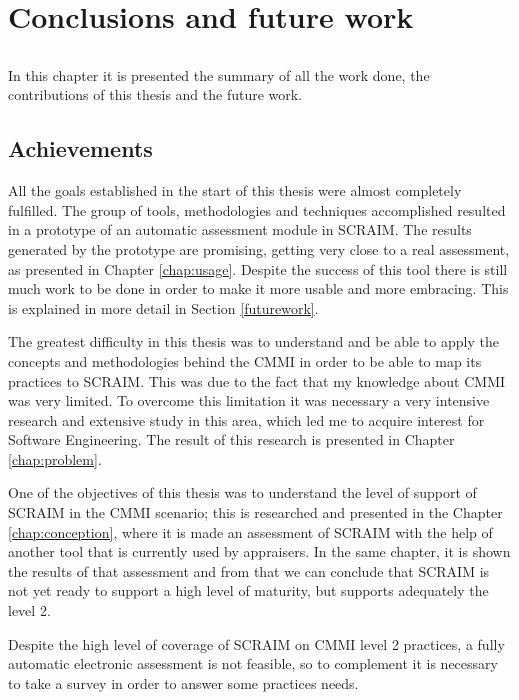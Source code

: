 \chapter{Conclusions and future work} \label{chap:conclusion}

\section*{}
In this chapter it is presented the summary of all the work done, the contributions of this thesis  and the future work.

\section{Achievements}

All the goals established in the start of this thesis were almost completely fulfilled. The group of tools, methodologies and techniques accomplished resulted in a prototype of an automatic assessment module in SCRAIM. The results generated by the prototype are promising, getting very close to a real assessment, as presented in Chapter \ref{chap:usage}. Despite the success of this tool there is still much work to be done in order to make it more usable and more embracing. This is explained in more detail in Section \ref{futurework}.

The greatest difficulty in this thesis was to understand and be able to apply the concepts and methodologies behind the CMMI in order to be able to map its practices to SCRAIM. This was due to the fact that my knowledge about CMMI was very limited. To overcome this limitation it was necessary a very intensive research and extensive study in this area, which led me to acquire interest for Software Engineering. The result of this research is presented in Chapter \ref{chap:problem}.

One of the objectives of this thesis was to understand the level of support of SCRAIM in the CMMI scenario; this is researched and presented in the Chapter \ref{chap:conception}, where it is made an assessment of SCRAIM with the help of another tool that is currently used by appraisers. In the same chapter, it is shown the results of that assessment and from that we can conclude that SCRAIM is not yet ready to support a high level of maturity, but supports adequately the level 2.

Despite the high level of coverage of SCRAIM on CMMI level 2 practices, a fully automatic electronic assessment is not feasible, so to complement it is necessary to take a survey in order to answer some practices needs. 

